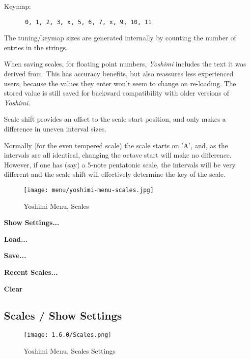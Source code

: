   Keymap:

   \begin{verbatim}
      0, 1, 2, 3, x, 5, 6, 7, x, 9, 10, 11
   \end{verbatim}

   The tuning/keymap sizes are generated internally by counting the number of
   entries in the strings.

   When saving scales, for floating point numbers, \textsl{Yoshimi} includes
   the text it was derived from. This has accuracy benefits,
   but also reassures less experienced users,
   because the values they enter won't seem to change on
   re-loading.  The stored value is still saved for backward compatibility with
   older versions of \textsl{Yoshimi}.

   Scale shift provides an offset to the scale start position, and only makes a
   difference in uneven interval sizes.

   Normally (for the even tempered scale) the scale starts on 'A', and, as the
   intervals are all identical, changing the octave start will make no
   difference. However, if one has (say) a 5-note pentatonic scale, the
   intervals will be very different and the scale shift will effectively
   determine the key of the scale.

\begin{figure}[H]
   \centering
   \texttt{[image: menu/yoshimi-menu-scales.jpg]}
   \caption{Yoshimi Menu, Scales}
   \label{fig:yoshimi_scales}
\end{figure}

   \begin{enumber}
      \item \textbf{Show Settings...}
      \item \textbf{Load...}
      \item \textbf{Save...}
      \item \textbf{Recent Scales...}
      \item \textbf{Clear}
   \end{enumber}

\subsection{Scales / Show Settings}
\label{subsec:scales_show}

\begin{figure}[H]
   \centering
   \texttt{[image: 1.6.0/Scales.png]}
   \caption{Yoshimi Menu, Scales Settings}
   \label{fig:yoshimi_scales_settings}
\end{figure}

